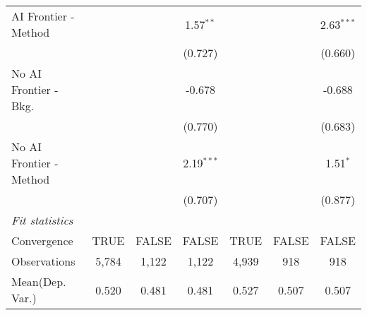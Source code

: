 \begin{tabular}{lcccccc}
   AI Frontier - Method    &               &              & 1.57$^{**}$  &               &              & 2.63$^{***}$\\   
                           &               &              & (0.727)      &               &              & (0.660)\\   
   No AI Frontier - Bkg.   &               &              & -0.678       &               &              & -0.688\\   
                           &               &              & (0.770)      &               &              & (0.683)\\   
   No AI Frontier - Method &               &              & 2.19$^{***}$ &               &              & 1.51$^{*}$\\   
                           &               &              & (0.707)      &               &              & (0.877)\\   
   \midrule
   \emph{Fit statistics}\\
   Convergence             &TRUE           & FALSE        & FALSE        & TRUE          & FALSE        & FALSE\\  
   Observations            & 5,784         & 1,122        & 1,122        & 4,939         & 918          & 918\\  
Mean(Dep. Var.) & 0.520 & 0.481 & 0.481 & 0.527 & 0.507 & 0.507 \\
   

\end{tabular}
